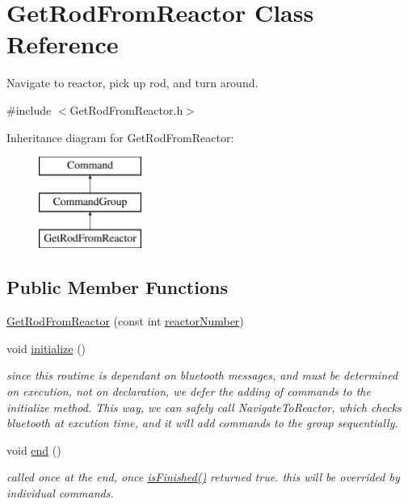 \hypertarget{classGetRodFromReactor}{\section{Get\-Rod\-From\-Reactor Class Reference}
\label{classGetRodFromReactor}
}


Navigate to reactor, pick up rod, and turn around.  




{\ttfamily \#include $<$Get\-Rod\-From\-Reactor.\-h$>$}

Inheritance diagram for Get\-Rod\-From\-Reactor\-:\begin{figure}[H]
\begin{center}
\leavevmode
\includegraphics[height=3.000000cm]{classGetRodFromReactor}
\end{center}
\end{figure}
\subsection*{Public Member Functions}
\begin{DoxyCompactItemize}
\item 
\hyperlink{classGetRodFromReactor_ae6432d3e1fd6ca0e882d9cbff1b14737}{Get\-Rod\-From\-Reactor} (const int \hyperlink{classGetRodFromReactor_ad2c4d389db38e728e540206aed467670}{reactor\-Number})
\item 
void \hyperlink{classGetRodFromReactor_afb5a43f9368820438622cc6e08a9df10}{initialize} ()
\begin{DoxyCompactList}\small\item\em since this routime is dependant on bluetooth messages, and must be determined on execution, not on declaration, we defer the adding of commands to the initialize method. This way, we can safely call Navigate\-To\-Reactor, which checks bluetooth at excution time, and it will add commands to the group sequentially. \end{DoxyCompactList}\item 
void \hyperlink{classGetRodFromReactor_a8d375cbbf822ea0f22058a264347bd37}{end} ()
\begin{DoxyCompactList}\small\item\em called once at the end, once \hyperlink{classCommandGroup_a96807a2763adf9e21ebf2cb9e3574e3c}{is\-Finished()} returned true. this will be overrided by individual commands. \end{DoxyCompactList}\end{DoxyCompactItemize}
